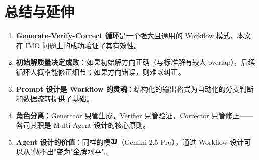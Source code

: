 \section{总结与延伸}

\begin{enumerate}
    \item \textbf{Generate-Verify-Correct 循环}是一个强大且通用的 Workflow 模式，本文在 IMO 问题上的成功验证了其有效性。
    \item \textbf{初始解质量决定成败}：如果初始解方向正确（与标准解有较大 overlap），后续循环大概率能修正细节；如果方向错误，则难以纠正。
    \item \textbf{Prompt 设计是 Workflow 的灵魂}：结构化的输出格式为自动化的分支判断和数据流转提供了基础。
    \item \textbf{角色分离}：Generator 只管生成，Verifier 只管验证，Corrector 只管修正——各司其职是 Multi-Agent 设计的核心原则。
    \item \textbf{Agent 设计的价值}：同样的模型（Gemini 2.5 Pro），通过 Workflow 设计可以从"做不出"变为"金牌水平"。
\end{enumerate}


